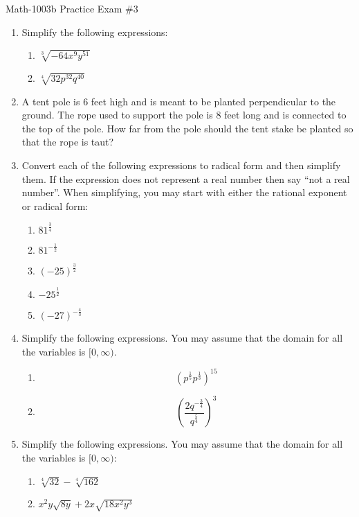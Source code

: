 \documentclass[letterpaper,12pt,fleqn]{article}
\begin{document}
\begin{center}
\Large Math-1003b Practice Exam \#3
\end{center}

\vspace{0.5in}

\begin{enumerate}
\item Simplify the following expressions:
  \begin{enumerate}
  \item $\sqrt[3]{-64x^9y^{51}}$
  \item $\sqrt[4]{32p^{32}q^{40}}$
  \end{enumerate}

\item A tent pole is 6 feet high and is meant to be planted perpendicular to the ground.
  The rope used to support the pole is 8 feet long and is connected to the top of the
  pole.  How far from the pole should the tent stake be planted so that the rope is taut?
  
\item Convert each of the following expressions to radical form and then simplify
  them. If the expression does not represent a real number then say
  ``not a real number''. When simplifying, you may start with either the rational
  exponent or radical form:
  \begin{enumerate}
  \item $81^{\frac{3}{4}}$
  \item $81^{-\frac{1}{2}}$
  \item $(-25)^{\frac{3}{2}}$
  \item $-25^{\frac{1}{2}}$
  \item $(-27)^{-\frac{4}{3}}$
  \end{enumerate}

\item Simplify the following expressions. You may assume that the domain for all the
  variables is $[0,\infty)$.
  \begin{enumerate}
  \item \[\left(p^{\frac{1}{5}}p^{\frac{1}{3}}\right)^{15}\]
  \item \[\left(\frac{2q^{-\frac{3}{4}}}{q^{\frac{5}{4}}}\right)^3\]
  \end{enumerate}
  
\item Simplify the following expressions. You may assume that the domain for all the
  variables is $[0,\infty)$:
  \begin{enumerate}
  \item $\sqrt[4]{32}-\sqrt[4]{162}$
  \item $x^2y\sqrt{8y}+2x\sqrt{18x^2y^3}$
  \end{enumerate}
  

\end{enumerate}
\end{document}
